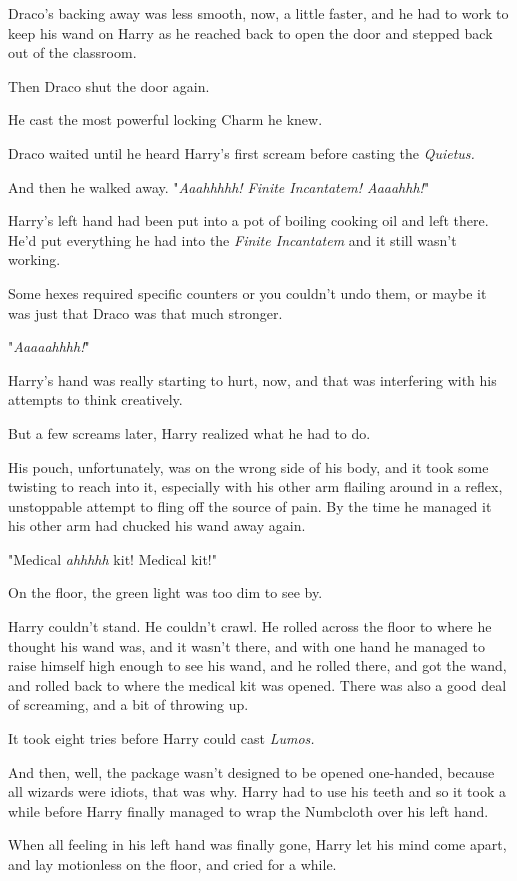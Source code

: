 Draco's backing away was less smooth, now, a little faster, and he had to work
to keep his wand on Harry as he reached back to open the door and stepped back
out of the classroom.

Then Draco shut the door again.

He cast the most powerful locking Charm he knew.

Draco waited until he heard Harry's first scream before casting the
\emph{Quietus.}

And then he walked away.
\later
"\emph{Aaahhhhh! Finite Incantatem! Aaaahhh!}"

Harry's left hand had been put into a pot of boiling cooking oil and left
there. He'd put everything he had into the \emph{Finite Incantatem} and it
still wasn't working.

Some hexes required specific counters or you couldn't undo them, or maybe it
was just that Draco was that much stronger.

"\emph{Aaaaahhhh!}"

Harry's hand was really starting to hurt, now, and that was interfering with
his attempts to think creatively.

But a few screams later, Harry realized what he had to do.

His pouch, unfortunately, was on the wrong side of his body, and it took some
twisting to reach into it, especially with his other arm flailing around in a
reflex, unstoppable attempt to fling off the source of pain. By the time he
managed it his other arm had chucked his wand away again.

"Medical \emph{ahhhhh} kit! Medical kit!"

On the floor, the green light was too dim to see by.

Harry couldn't stand. He couldn't crawl. He rolled across the floor to where he
thought his wand was, and it wasn't there, and with one hand he managed to
raise himself high enough to see his wand, and he rolled there, and got the
wand, and rolled back to where the medical kit was opened. There was also a
good deal of screaming, and a bit of throwing up.

It took eight tries before Harry could cast \emph{Lumos.}

And then, well, the package wasn't designed to be opened one-handed, because
all wizards were idiots, that was why. Harry had to use his teeth and so it
took a while before Harry finally managed to wrap the Numbcloth over his left
hand.

When all feeling in his left hand was finally gone, Harry let his mind come
apart, and lay motionless on the floor, and cried for a while.

